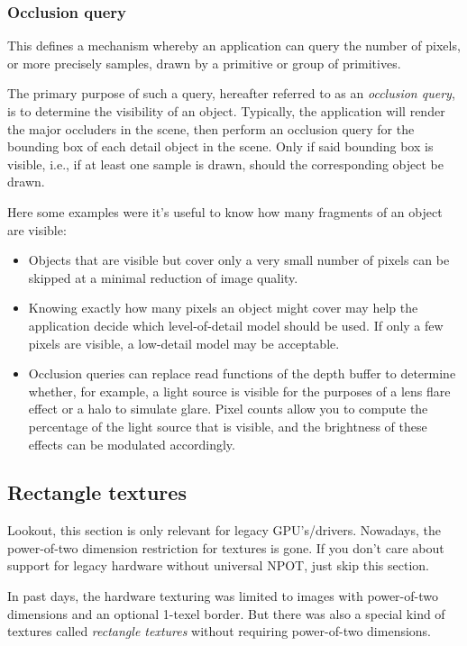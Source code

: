 \subsubsection{Occlusion query}
This defines a mechanism whereby an application can query the number of pixels, or more precisely samples, drawn by a primitive or group of primitives.

The primary purpose of such a query, hereafter referred to as an \emph{occlusion query}, is to determine the visibility of an object. Typically, the application will render the major occluders in the scene, then perform an occlusion query for the bounding box of each detail object in the scene. Only if said bounding box is visible, i.e., if at least one sample is drawn, should the corresponding object be drawn.

Here some examples were it's useful to know how many fragments of an object are visible:
\begin{itemize}
\item{Objects that are visible but cover only a very small number of pixels can be skipped at a minimal reduction of image quality.}
\item{Knowing exactly how many pixels an object might cover may help the application decide which level-of-detail model should be used. If only a few pixels are visible, a low-detail model may be acceptable.}
\item{Occlusion queries can replace read functions of the depth buffer to determine whether, for example, a light source is visible for the purposes of a lens flare effect or a halo to simulate glare. Pixel counts allow you to compute the percentage of the light source that is visible, and the brightness of these effects can be modulated accordingly.}
\end{itemize}




\subsection{Rectangle textures}
\hypertarget{Rectangle textures}{}
Lookout, this section is only relevant for legacy GPU's/drivers. Nowadays, the power-of-two dimension restriction for textures is gone. If you don't care about support for legacy hardware without universal NPOT, just skip this section.

In past days, the hardware texturing was limited to images with power-of-two dimensions and an optional 1-texel border. But there was also a special kind of textures called \emph{rectangle textures} without requiring power-of-two dimensions.

